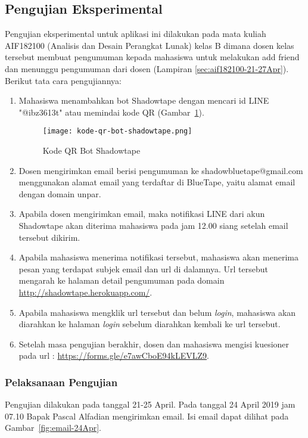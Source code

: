 \subsection{Pengujian Eksperimental}
Pengujian eksperimental untuk aplikasi ini dilakukan pada mata kuliah AIF182100 (Analisis dan Desain Perangkat Lunak) kelas B dimana dosen kelas tersebut membuat pengumuman kepada mahasiswa untuk melakukan add friend dan menunggu pengumuman dari dosen (Lampiran \ref{sec:aif182100-21-27Apr}). Berikut tata cara pengujiannya:
\begin{enumerate}
\item Mahasiswa menambahkan bot Shadowtape dengan mencari id LINE "@ibz3613t" atau memindai kode QR (Gambar~\ref{fig:kode-qr-bot-shadowtape}).

\begin{figure}[H]
	\centering  
	\texttt{[image: kode-qr-bot-shadowtape.png]}  
	\caption[Kode QR Bot Shadowtape]{Kode QR Bot Shadowtape} 
	\label{fig:kode-qr-bot-shadowtape} 
\end{figure}

\item Dosen mengirimkan email berisi pengumuman ke shadowbluetape@gmail.com menggunakan alamat email yang terdaftar di BlueTape, yaitu alamat email dengan domain unpar.
\item Apabila dosen mengirimkan email, maka notifikasi LINE dari akun Shadowtape akan diterima mahasiswa pada jam 12.00 siang setelah email tersebut dikirim.
\item Apabila mahasiswa menerima notifikasi tersebut, mahasiswa akan menerima pesan yang terdapat subjek email dan url di dalamnya. Url tersebut mengarah ke halaman detail pengumuman pada domain \url{http://shadowtape.herokuapp.com/}.
\item Apabila mahasiswa mengklik url tersebut dan belum \textit{login}, mahasiswa akan diarahkan ke halaman \textit{login} sebelum diarahkan kembali ke url tersebut.
\item Setelah masa pengujian berakhir, dosen dan mahasiswa mengisi kuesioner pada url : \url{https://forms.gle/e7awCboE94kLEVLZ9}.
\end{enumerate}

\subsubsection{Pelaksanaan Pengujian}
Pengujian dilakukan pada tanggal 21-25 April. Pada tanggal 24 April 2019 jam 07.10 Bapak Pascal Alfadian mengirimkan email. Isi email dapat dilihat pada Gambar~\ref{fig:email-24Apr}.

